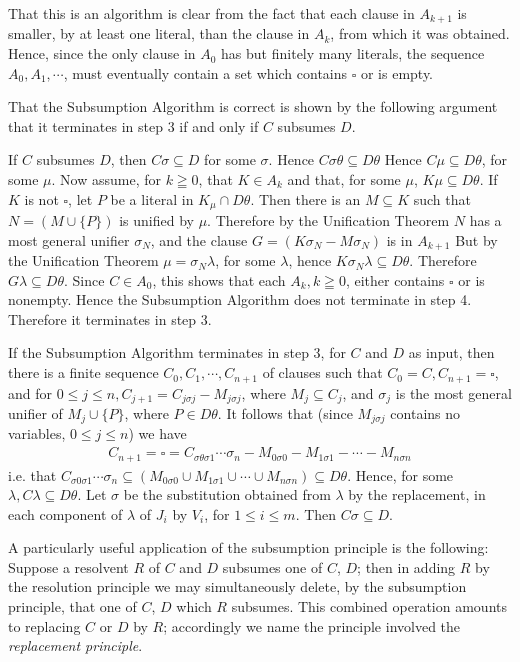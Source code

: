 \documentclass[8pt]{extarticle}
\begin{document}
That this is an algorithm is clear from the fact that each clause in $A_{k+1}$ is smaller, by at least one literal, than the clause in $A_k$, from which it was obtained. Hence, since the only clause in $A_0$ has but finitely many literals, the sequence $A_0, A_1,\dotsm$, must eventually contain a set which contains $\square$ or is empty. 

That the Subsumption Algorithm is correct is shown by the following argument that it terminates in step 3 if and only if $C$ subsumes $D$.

If $C$ subsumes $D$, then $C\sigma\subseteq D$ for some $\sigma$. Hence $C\sigma\theta\subseteq D\theta$ Hence $C\mu\subseteq D\theta$, for some $\mu$. Now assume, for $k\geqq 0$, that $K \in A_k$ and that, for some $\mu$, $K\mu\subseteq D\theta$. If $K$ is not $\square$, let $P$ be a literal in $K_\mu \cap D\theta$. Then there is an $M \subseteq K$ such that $N = (M\cup\{P\})$ is unified by $\mu$. Therefore by the Unification Theorem $N$ has a most general unifier $\sigma_N$, and the clause $G = (K\sigma_N - M\sigma_N)$ is in $A_{k+1}$ But by the Unification Theorem $\mu = \sigma_N\lambda$, for some $\lambda$, hence $K\sigma_N\lambda\subseteq D\theta$. Therefore $G\lambda\subseteq D\theta$. Since $C \in A_0$, this shows that each $A_k, k\geqq 0$, either contains $\square$ or is nonempty. Hence the Subsumption Algorithm does not terminate in step 4. Therefore it terminates in step 3.

If the Subsumption Algorithm terminates in step 3, for $C$ and $D$ as input, then there is a finite sequence
$C_0,C_1,\dotsm,C_{n+1}$ of clauses such that $C_0 = C, C_{n+1} = \square$, and for $0\leq j \leq n, C_{j+1} = C_{j\sigma j} - M_{j\sigma j}$, where $M_j\subseteq C_j$, and $\sigma_j$ is the most general unifier of $M_j \cup\{P\}$, where $P\in D\theta$. It follows that (since $M_{j\sigma j}$ contains no variables, $0\leq j\leq n$) we have
\begin{align*}
    C_{n+1} = \square = C_{\sigma \theta \sigma 1}\dotsm \sigma_n - M_{0\sigma0} - M_{1\sigma 1} - \dotsm - M_{n\sigma n}
\end{align*}
\noindent
i.e. that $C_{\sigma 0\sigma 1}\dotsm\sigma_n\subseteq(M_{0\sigma 0}\cup M_{1\sigma 1}\cup\dotsm\cup M_{n\sigma n})\subseteq D\theta$. Hence, for some $\lambda, C\lambda\subseteq D\theta$. Let $\sigma$ be the substitution obtained from $\lambda$ by the replacement, in each component of $\lambda$ of $J_i$ by $V_i$, for $1\leq i\leq m$. Then $C\sigma\subseteq D$.

A particularly useful application of the subsumption principle is the following: Suppose a resolvent $R$ of $C$ and $D$ subsumes one of $C$, $D$; then in adding 
$R$ by the resolution principle we may simultaneously delete, by the subsumption principle, that one of $C$, $D$ which $R$ subsumes. This combined operation 
amounts to replacing $C$ or $D$ by $R$; accordingly we name the principle involved the \emph{replacement principle}.
\end{document}
